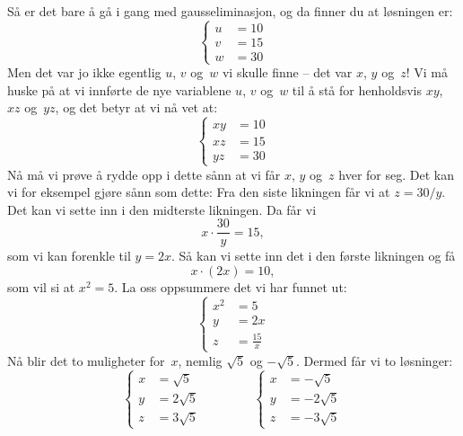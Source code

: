 \begin{losning}
Så er det bare å gå i gang med gausseliminasjon, og da finner du at
løsningen er:
\[
\left\{
\begin{aligned}
  u &= 10 \\
  v &= 15 \\
  w &= 30
\end{aligned}
\right.
\]
Men det var jo ikke egentlig $u$, $v$ og~$w$ vi skulle finne -- det
var $x$, $y$ og~$z$!  Vi må huske på at vi innførte de nye variablene
$u$, $v$ og~$w$ til å stå for henholdsvis $xy$, $xz$ og~$yz$, og det
betyr at vi nå vet at:
\[
\left\{
\begin{aligned}
 xy &= 10 \\
 xz &= 15 \\
 yz &= 30
\end{aligned}
\right.
\]
Nå må vi prøve å rydde opp i dette sånn at vi får $x$, $y$ og~$z$ hver
for seg.  Det kan vi for eksempel gjøre sånn som dette: Fra den siste
likningen får vi at $z = 30/y$.  Det kan vi sette inn i den midterste
likningen.  Da får vi
\[
x \cdot \frac{30}{y} = 15,
\]
som vi kan forenkle til $y = 2x$.  Så kan vi sette inn det i den
første likningen og få
\[
x \cdot (2x) = 10,
\]
som vil si at $x^2 = 5$.
La oss oppsummere det vi har funnet ut:
\[
\left\{
\begin{aligned}
x^2 &= 5 \\
y &= 2x \\
z &= \frac{15}{x}
\end{aligned}
\right.
\]
Nå blir det to muligheter for~$x$, nemlig $\sqrt{5}$ og $-\sqrt{5}$.
Dermed får vi to løsninger:
\[
\left\{
\begin{aligned}
x &= \sqrt{5} \\
y &= 2 \sqrt{5} \\
z &= 3 \sqrt{5}
\end{aligned}
\right.
\qquad\qquad
\left\{
\begin{aligned}
x &= -\sqrt{5} \\
y &= -2 \sqrt{5} \\
z &= -3 \sqrt{5}
\end{aligned}
\right.
\]
\end{losning}


